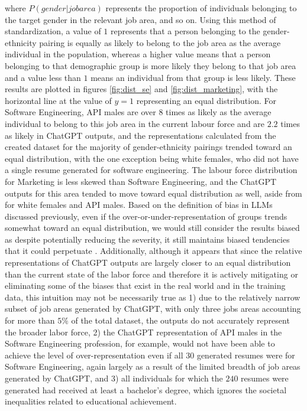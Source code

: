 \documentclass{article}
\begin{document}
    where $ P(gender | job area) $ represents the proportion of individuals belonging to the target gender in the relevant job area, and so on. Using this method of standardization, a value of $ 1 $ represents that a person belonging to the gender-ethnicity pairing is equally as likely to belong to the job area as the average individual in the population, whereas a higher value means that a person belonging to that demographic group is more likely they belong to that job area and a value less than $1$ means an individual from that group is less likely. These results are plotted in figures \ref{fig:dist_se} and \ref{fig:dist_marketing}, with the horizontal line at the value of $y=1$ representing an equal distribution. For Software Engineering, API males are over $8$ times as likely as the average individual to belong to this job area in the current labour force and are $2.2$ times as likely in ChatGPT outputs, and the representations calculated from the created dataset for the majority of gender-ethnicity pairings trended toward an equal distribution, with the one exception being white females, who did not have a single resume generated for software engineering. The labour force distribution for Marketing is less skewed than Software Engineering, and the ChatGPT outputs for this area tended to move toward equal distribution as well, aside from for white females and API males. Based on the definition of bias in LLMs discussed previously, even if the over-or-under-representation of groups trends somewhat toward an equal distribution, we would still consider the results biased as despite potentially reducing the severity, it still maintains biased tendencies that it could perpetuate \cite{borji2023categorical}. Additionally, although it appears that since the relative representations of ChatGPT outputs are largely closer to an equal distribution than the current state of the labor force and therefore it is actively mitigating or eliminating some of the biases that exist in the real world and in the training data, this intuition may not be necessarily true as 1) due to the relatively narrow subset of job areas generated by ChatGPT, with only three jobs areas accounting for more than $5\%$ of the total dataset, the outputs do not accurately represent the broader labor force, 2) the ChatGPT representation of API males in the Software Engineering profession, for example, would not have been able to achieve the level of over-representation even if all $30$ generated resumes were for Software Engineering, again largely as a result of the limited breadth of job areas generated by ChatGPT, and 3) all individuals for which the $240$ resumes were generated had received at least a bachelor's degree, which ignores the societal inequalities related to educational achievement.
\end{document}
